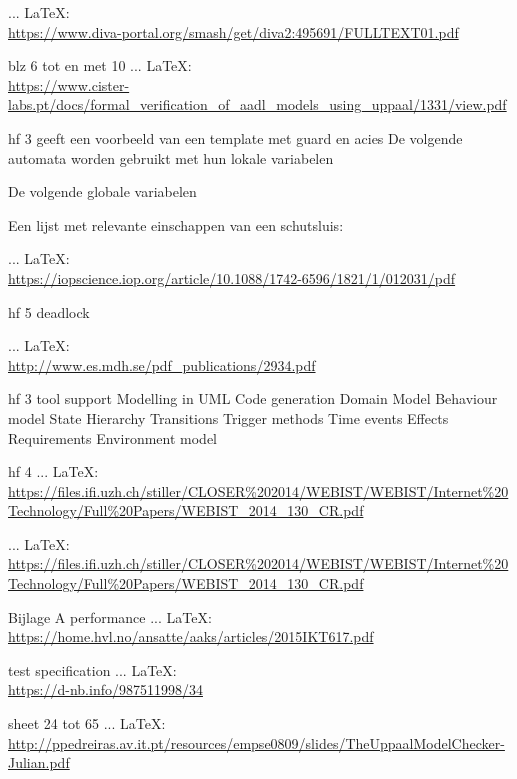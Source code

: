 \begin{thebibliography}{99}
{{{{{{ ... \LaTeX:\\ \url{https://www.diva-portal.org/smash/get/diva2:495691/FULLTEXT01.pdf}

blz 6 tot en met 10
 ... \LaTeX:\\ \url{https://www.cister-labs.pt/docs/formal_verification_of_aadl_models_using_uppaal/1331/view.pdf}

hf 3 geeft een voorbeeld van een template met guard en acies
De volgende automata worden gebruikt met hun lokale variabelen

De volgende globale variabelen

Een lijst met relevante einschappen van een schutsluis:

 ... \LaTeX:\\ \url{https://iopscience.iop.org/article/10.1088/1742-6596/1821/1/012031/pdf}

hf 5
deadlock

 ... \LaTeX:\\ \url{http://www.es.mdh.se/pdf_publications/2934.pdf}

hf 3 tool support
Modelling in UML
Code generation
Domain Model
Behaviour model
State Hierarchy
Transitions
Trigger methods
Time events
Effects
Requirements
Environment model

hf 4
 ... \LaTeX:\\ \url{https://files.ifi.uzh.ch/stiller/CLOSER%202014/WEBIST/WEBIST/Internet%20Technology/Full%20Papers/WEBIST_2014_130_CR.pdf}


 ... \LaTeX:\\ \url{https://files.ifi.uzh.ch/stiller/CLOSER%202014/WEBIST/WEBIST/Internet%20Technology/Full%20Papers/WEBIST_2014_130_CR.pdf}




Bijlage A performance
 ... \LaTeX:\\ \url{https://home.hvl.no/ansatte/aaks/articles/2015IKT617.pdf}

test specification
 ... \LaTeX:\\ \url{https://d-nb.info/987511998/34}

sheet 24 tot 65
 ... \LaTeX:\\ \url{http://ppedreiras.av.it.pt/resources/empse0809/slides/TheUppaalModelChecker-Julian.pdf}


}}}}}}
\end{thebibliography}
